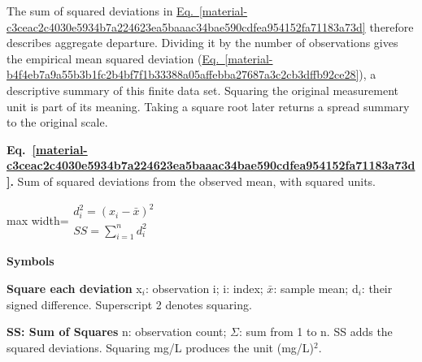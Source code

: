 \documentclass[11pt,a4paper]{article}
\begin{document}
The sum of squared deviations in \hyperref[material-c3ceac2c4030e5934b7a224623ea5baaac34bae590cdfea954152fa71183a73d]{Eq.~\ref*{material-c3ceac2c4030e5934b7a224623ea5baaac34bae590cdfea954152fa71183a73d}} therefore describes aggregate departure. Dividing it by the number of observations gives the empirical mean squared deviation (\hyperref[material-b4f4eb7a9a55b3b1fc2b4bf7f1b33388a05affebba27687a3c2cb3dffb92ce28]{Eq.~\ref*{material-b4f4eb7a9a55b3b1fc2b4bf7f1b33388a05affebba27687a3c2cb3dffb92ce28}}), a descriptive summary of this finite data set. Squaring the original measurement unit is part of its meaning. Taking a square root later returns a spread summary to the original scale.


\par\medskip
\begin{samepage}
\label{material-c3ceac2c4030e5934b7a224623ea5baaac34bae590cdfea954152fa71183a73d}
\noindent\textbf{Eq.~\ref*{material-c3ceac2c4030e5934b7a224623ea5baaac34bae590cdfea954152fa71183a73d}.} Sum of squared deviations from the observed mean, with squared units.\par\nopagebreak
\begin{center}\begin{adjustbox}{max width=\linewidth}$\displaystyle \begin{gathered}d_i^2=(x_i-\bar{x})^2\\SS=\sum_{i=1}^{n}d_i^2\end{gathered}$\end{adjustbox}\end{center}

\par\noindent\textbf{Symbols}

\par\noindent\textbf{Square each deviation} x\ensuremath{{}_i}: observation i; i: index; \ensuremath{\bar{x}}: sample mean; d\ensuremath{{}_i}: their signed difference. Superscript 2 denotes squaring.

\par\noindent\textbf{SS: Sum of Squares} n: observation count; \ensuremath{\Sigma}: sum from 1 to n. SS adds the squared deviations. Squaring mg/L produces the unit (mg/L)\ensuremath{{}^2}.

\end{samepage}
\medskip
\end{document}
